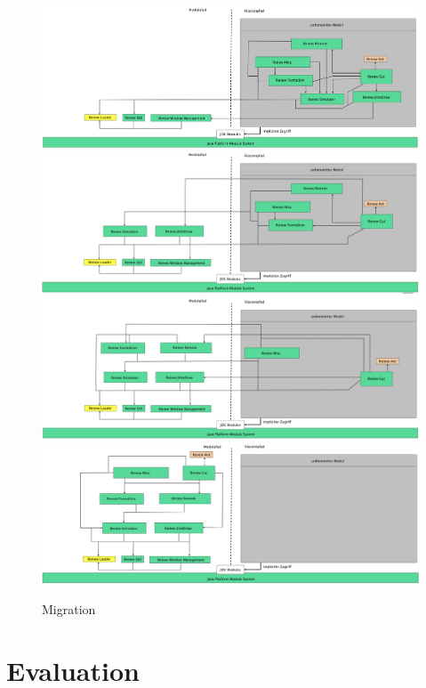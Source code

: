 	\begin{figure}
	  \centering
	  \includegraphics[width=\textwidth]{material/images/1step.png}
	  \includegraphics[width=\textwidth]{material/images/2step.png}
	  \includegraphics[width=\textwidth]{material/images/3step.png}
	  \includegraphics[width=\textwidth]{material/images/4step.png}
	  \caption{Migration}
	  \label{fig:migration}
	\end{figure}	

\section{Evaluation}
